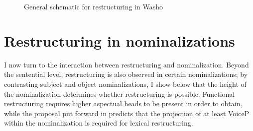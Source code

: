 \documentclass[output=paper]{langscibook}
\begin{document}
\begin{figure}
\caption{General schematic for restructuring in Washo\label{fig:haninkwarmupstructure}}
\end{figure}



\section{Restructuring in nominalizations}\label{haninksec:3}

I now turn to the interaction between restructuring and nominalization. Beyond the sentential level, restructuring is also observed in certain nominalizations; by contrasting subject and object nominalizations, I show below  that the height of the nominalization determines whether restructuring is possible. Functional restructuring requires higher aspectual heads to be present in order to obtain, while the proposal put forward in  predicts that the projection of at least VoiceP  within the nominalization is required for lexical restructuring. %
\end{document}

